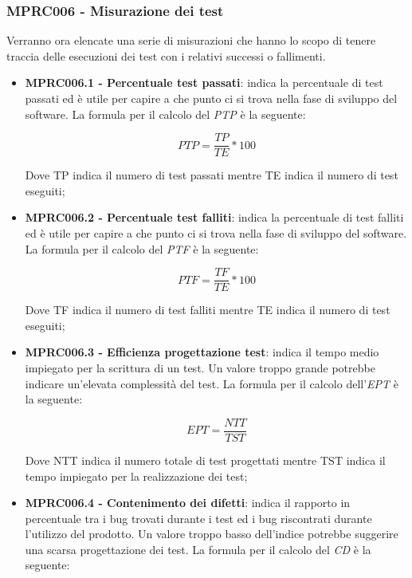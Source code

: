 {\subsubsection{MPRC006 - Misurazione dei test}
Verranno ora elencate una serie di misurazioni che hanno lo scopo di tenere traccia delle esecuzioni dei test con i relativi successi o fallimenti.
\begin{itemize}
    \item \textbf{MPRC006.1 - Percentuale test passati}: indica la percentuale di test passati ed è utile per capire a che punto ci si trova nella fase di sviluppo del software. La formula per il calcolo del \textit{PTP} è la seguente:
    \begin{center}
        \begin{displaymath}
            PTP = \frac{TP}{TE} * 100
        \end{displaymath}
    \end{center}
    Dove TP indica il numero di test passati mentre TE indica il numero di test eseguiti;
    \item \textbf{MPRC006.2 - Percentuale test falliti}: indica la percentuale di test falliti ed è utile per capire a che punto ci si trova nella fase di sviluppo del software. La formula per il calcolo del \textit{PTF} è la seguente:
    \begin{center}
        \begin{displaymath}
            PTF = \frac{TF}{TE} * 100
        \end{displaymath}
    \end{center}
    Dove TF indica il numero di test falliti mentre TE indica il numero di test eseguiti;
    \item \textbf{MPRC006.3 - Efficienza progettazione test}: indica il tempo medio impiegato per la scrittura di un test. Un valore troppo grande potrebbe indicare un'elevata complessità del test. La formula per il calcolo dell'\textit{EPT} è la seguente:
    \begin{center}
        \begin{displaymath}
            EPT = \frac{NTT}{TST}
        \end{displaymath}
    \end{center}
    Dove NTT indica il numero totale di test progettati mentre TST indica il tempo impiegato per la realizzazione dei test;
    \item \textbf{MPRC006.4 - Contenimento dei difetti}: indica il rapporto in percentuale tra i bug trovati durante i test ed i bug riscontrati durante l'utilizzo del prodotto. Un valore troppo basso dell'indice potrebbe suggerire una scarsa progettazione dei test. La formula per il calcolo del \textit{CD} è la seguente:

\end{itemize}}
